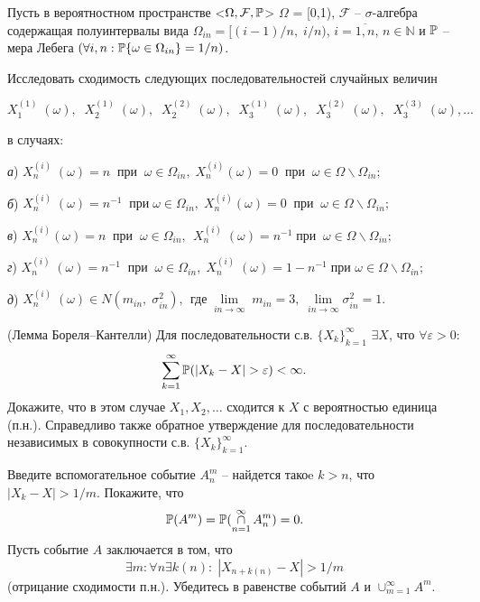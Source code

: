 \begin{problem}
Пусть в вероятностном пространстве  <$\Omega, \mathcal{F},\mathrm{{\mathbb P}}$>  $\Omega$ = [0,1), $\mathcal{F}$  -- $\sigma$-алгебра содержащая полуинтервалы вида $\Omega _{in} =[(i-1)/n,\; i/n)$,  $i = \overline{1,n}$, $n \in \mathbb{N}$  и $\mathrm{{\mathbb P}}$ -- мера  Лебега $(\forall i,n:\mathrm{{\mathbb P}}\{ \omega \in \Omega _{in} \} =1/n)$.

Исследовать сходимость следующих последовательностей случайных величин 

$X_{1}^{(1)} \; (\omega ),\; \; X_{2}^{(1)} \; (\omega ),\; \; X_{2}^{(2)} \; (\omega ),\; \; X_{3}^{(1)} \; (\omega ),\; \; X_{3}^{(2)} \; (\omega ),\; \; X_{3}^{(3)} \; (\omega ),\ldots $

в случаях:

\textit{а}) $X_{n}^{(i)} \; (\omega )=n\; \; \text{при}\; \; \omega \in \Omega _{in} ,\; X_{n}^{(i)} (\omega )=0\; \; \text{при}\; \; \omega \in \Omega \backslash \Omega _{in} ;$

\textit{б}) $X_{n}^{(i)} \; (\omega )=n^{-1} \; \; \text{при} \; \omega \in \Omega _{in} ,\; X_{n}^{(i)} (\omega )=0\; \; \text{при} \; \; \omega \in \Omega \backslash \Omega _{in} ;$

\textit{в}) $X_{n}^{(i)} (\omega )=n\; \; \text{при}\; \; \omega \in \Omega _{in} ,\; \, X_{n}^{(i)} \; (\omega )=n^{-1} \; \text{при}\; \; \omega \in \Omega \backslash \Omega _{in} ;$

\textit{г}) $X_{n}^{(i)} \; (\omega )=n^{-1} \; \; \text{при}\; \; \omega \in \Omega _{in} ,\; X_{n}^{(i)} \; (\omega )=1-n^{-1} \; \text{при}$ $\omega \in \Omega \backslash \Omega _{in} ;$

\textit{д}) $X_{n}^{(i)} \; (\omega )\in N(m_{in} ,\; \sigma _{in}^{2} ),\; \, \text{где}\; \mathop{\lim }\limits_{in\to \infty } \; m_{in} =3,\; \mathop{\lim }\limits_{in\to \infty } \sigma _{in}^{2} =1.$
\end{problem}


\begin{problem}(Лемма Бореля--Кантелли)
\label{bor_kant}
Для последовательности с.в. $\{X_k\}_{k=1}^{\infty}$  $\exists X$, что $\forall \varepsilon >0$: 
\[
\sum \limits_{k=1}^{\infty} \mathrm{{\mathbb P}}(|X_k - X| > \varepsilon) < \infty.
\] 
Докажите, что в этом случае $X_1, X_2, \ldots$ сходится к $X$ с вероятностью единица (п.н.). Справедливо также обратное утверждение для последовательности независимых в совокупности с.в. $\{X_k\}_{k=1}^{\infty}$.
\end{problem}

\begin{ordre}
Введите вспомогательное событие $A_n^m$ -- найдется такоe $k > n$, что $|X_k - X| > 1/m$. Покажите, что 
\[
\mathrm{{\mathbb P}}(A^m) = \mathrm{{\mathbb P}}(\mathop{\cap} \limits_{n=1}^{\infty} A_n^m) = 0.
\] 
Пусть событие  $A$ заключается в том, что  \[\exists m: \forall n \exists k(n): \; |X_{n+k(n)} - X| > 1/m\] (отрицание сходимости п.н.). Убедитесь в равенстве событий  $A$ и $\cup_{m=1}^{\infty} A^m$.
\end{ordre}

